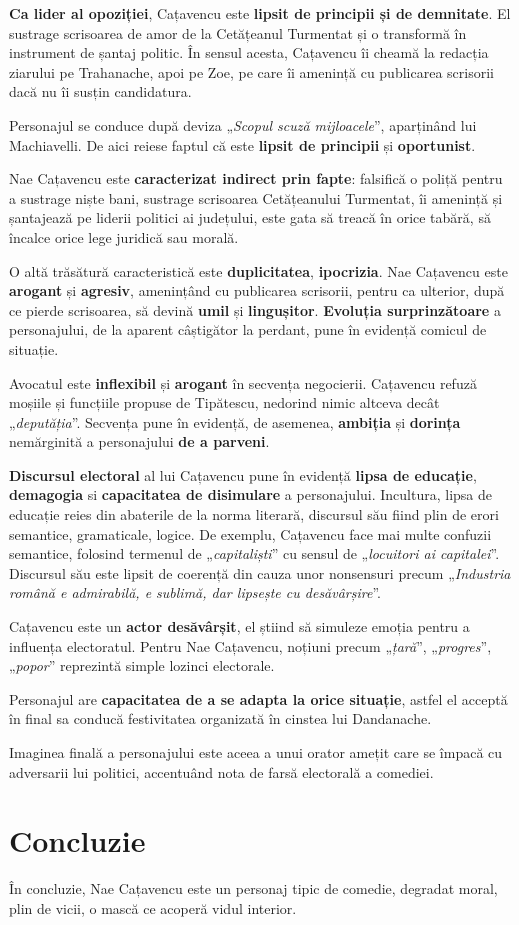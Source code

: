 \documentclass{article}
\newcommand{\qu}[1]{„\emph{#1}”}
\begin{document}
\textbf{Ca lider al opoziției}, Cațavencu este \textbf{lipsit de principii și de demnitate}. El sustrage scrisoarea de amor de la Cetățeanul Turmentat și o transformă în instrument de șantaj politic. În sensul acesta, Cațavencu îi cheamă la redacția ziarului pe Trahanache, apoi pe Zoe, pe care îi amenință cu publicarea scrisorii dacă nu îi susțin candidatura.

Personajul se conduce după deviza \qu{Scopul scuză mijloacele}, aparținând lui Machiavelli. De aici reiese faptul că este \textbf{lipsit de principii} și \textbf{oportunist}.

Nae Cațavencu este \textbf{caracterizat indirect prin fapte}: falsifică o poliță pentru a sustrage niște bani, sustrage scrisoarea Cetățeanului Turmentat, îi amenință și șantajează pe liderii politici ai județului, este gata să treacă în orice tabără, să încalce orice lege juridică sau morală.

O altă trăsătură caracteristică este \textbf{duplicitatea}, \textbf{ipocrizia}. Nae Cațavencu este \textbf{arogant} și \textbf{agresiv}, amenințând cu publicarea scrisorii, pentru ca ulterior, după ce pierde scrisoarea, să devină \textbf{umil} și \textbf{lingușitor}. \textbf{Evoluția surprinzătoare} a personajului, de la aparent câștigător la perdant, pune în evidență comicul de situație.

Avocatul este \textbf{inflexibil} și \textbf{arogant} în secvența negocierii. Cațavencu refuză moșiile și funcțiile propuse de Tipătescu, nedorind nimic altceva decât \qu{deputăția}. Secvența pune în evidență, de asemenea, \textbf{ambiția} și \textbf{dorința} nemărginită a personajului \textbf{de a parveni}.

\textbf{Discursul electoral} al lui Cațavencu pune în evidență \textbf{lipsa de educație}, \textbf{demagogia} si \textbf{capacitatea de disimulare} a personajului. Incultura, lipsa de educație reies din abaterile de la norma literară, discursul său fiind plin de erori semantice, gramaticale, logice. De exemplu, Cațavencu face mai multe confuzii semantice, folosind termenul de \qu{capitaliști} cu sensul de \qu{locuitori ai capitalei}. Discursul său este lipsit de coerență din cauza unor nonsensuri precum \qu{Industria română e admirabilă, e sublimă, dar lipsește cu desăvârșire}.

Cațavencu este un \textbf{actor desăvârșit}, el știind să simuleze emoția pentru a influența electoratul. Pentru Nae Cațavencu, noțiuni precum \qu{țară}, \qu{progres}, \qu{popor} reprezintă simple lozinci electorale.

Personajul are \textbf{capacitatea de a se adapta la orice situație}, astfel el acceptă în final sa conducă festivitatea organizată în cinstea lui Dandanache.

Imaginea finală a personajului este aceea a unui orator amețit care se împacă cu adversarii lui politici, accentuând nota de farsă electorală a comediei. 
\section{Concluzie}
În concluzie, Nae Cațavencu este un personaj tipic de comedie, degradat moral, plin de vicii, o mască ce acoperă vidul interior.
\end{document}
